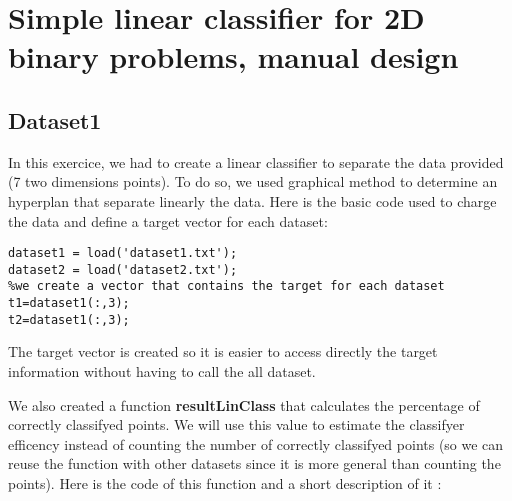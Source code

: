 \documentclass[a4paper]{article}
\begin{document}
	\pagebreak
	\section{Simple linear classifier for 2D binary problems, manual design}
	\subsection{Dataset1}
	In this exercice, we had to create a linear classifier to separate the data provided (7 two dimensions points). To do so, we used graphical method to determine an hyperplan that separate linearly the data. Here is the basic code used to charge the data and define a target vector for each dataset:
\begin{lstlisting}[frame=single]
%load a file :
dataset1 = load('dataset1.txt');
dataset2 = load('dataset2.txt');
%we create a vector that contains the target for each dataset
t1=dataset1(:,3);
t2=dataset1(:,3);
\end{lstlisting}
	
	
	The target vector is created so it is easier to access directly the target information without having to call the all dataset.
	
	
	We also created a function \textbf{resultLinClass} that calculates the percentage of correctly classifyed points. We will use this value to estimate the classifyer efficency instead of counting the number of correctly classifyed points (so we can reuse the function with other datasets since it is more general than counting the points). Here is the code of this function and a short description of it :
	
\end{document}
